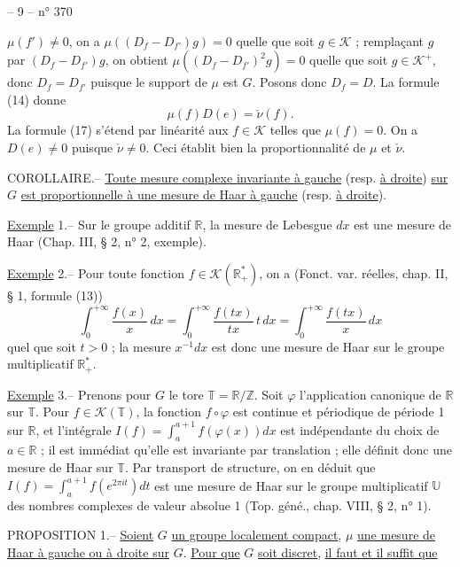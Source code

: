 -- 9 -- \hfill n° 370

$\mu(f')\ne0$, on a $\mu((D_f-D_{f'})g)=0$ quelle que soit $g\in\mathcal K$ ; remplaçant $g$ par
$(D_f-D_{f'})g$, on obtient $\mu((D_f-D_{f'})^2g)=0$ quelle que soit $g\in\mathcal K^+$, donc
$D_f=D_{f'}$ puisque le support de $\mu$ est $G$. Posons donc $D_f=D$. La formule (14)
donne
\[
\tag{17} \mu(f)D(e)=\check\nu(f).
\]
La formule (17) s'étend par linéarité aux $f\in\mathcal K$ telles que $\mu(f)=0$. On a
$D(e)\ne0$ puisque $\check\nu\ne0$. Ceci établit bien la proportionnalité de $\mu$ et $\check\nu$.

COROLLAIRE.-- \uline{Toute mesure complexe invariante à gauche} (resp. \uline{à droite}) \uline{sur} $G$
\uline{est proportionnelle à une mesure de Haar à gauche} (resp. \uline{à droite}).

\uline{Exemple} 1.-- Sur le groupe additif $\mathbb R$, la mesure de Lebesgue $dx$ est une mesure
de Haar (Chap. III, § 2, n° 2, exemple).

\uline{Exemple} 2.-- Pour toute fonction $f\in\mathcal K(\mathbb R_+^*)$, on a (Fonct. var. réelles, chap.
II, § 1, formule (13))
\[
\int_0^{+\infty}\frac{f(x)}x\,dx
=\int_0^{+\infty}\frac{f(tx)}{tx}\,t\,dx
=\int_0^{+\infty}\frac{f(tx)}x\,dx
\]
quel que soit $t>0$ ; la mesure $x^{-1}dx$ est donc une mesure de Haar sur le groupe
multiplicatif $\mathbb R_+^*$.

\uline{Exemple} 3.-- Prenons pour $G$ le tore $\mathbb T=\mathbb R/\mathbb Z$. Soit $\varphi$ l'application canonique
de $\mathbb R$ sur $\mathbb T$. Pour $f\in\mathcal K(\mathbb T)$, la fonction $f\circ\varphi$ est continue et périodique de
période 1 sur $\mathbb R$, et l'intégrale $I(f)=\int_a^{a+1}f(\varphi(x))dx$ est indépendante du
choix de $a\in\mathbb R$ ; il est immédiat qu'elle est invariante par translation ; elle
définit donc une mesure de Haar sur $\mathbb T$. Par transport de structure, on en
déduit que $I(f)=\int_a^{a+1}f(e^{2\pi it})dt$ est une mesure de Haar sur le groupe multiplicatif
$\mathbb U$ des nombres complexes de valeur absolue 1 (Top. géné., chap. VIII,
§ 2, n° 1).

PROPOSITION 1.-- \uline{Soient} $G$ \uline{un groupe localement compact}, $\mu$ \uline{une mesure de Haar à
gauche ou à droite sur} $G$. \uline{Pour que} $G$ \uline{soit discret}, \uline{il faut et il suffit que}
